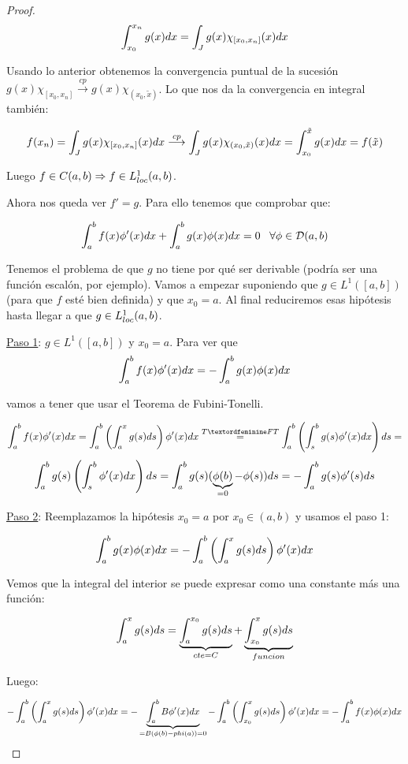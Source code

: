 \begin{proof}
\[
\displaystyle\int_{ x_0 }^{ x_n } g(x)dx=\displaystyle\int_{ J }^{  } g(x)\chi_{[x_0,x_n]}(x)dx
\]

Usando lo anterior obtenemos la convergencia puntual de la sucesión $g(x)\chi_{[x_0,x_n]}\overset{cp}{\longrightarrow}g(x)\chi_{(x_0,\tilde{x})}$. Lo que nos da la convergencia en integral también:

\[
f(x_n)=\displaystyle\int_{ J }^{  } g(x)\chi_{[x_0,x_n]}(x)dx\overset{cp}{\longrightarrow}\displaystyle\int_{ J }^{  } g(x)\chi_{(x_0,\tilde{x})}(x)dx=\displaystyle\int_{ x_0 }^{ \tilde{x} } g(x)dx=f(\tilde{x})
\]

Luego $f\in C(a,b) \Rightarrow f\in L^1_{loc}(a,b)$.

Ahora nos queda ver $f'=g$. Para ello tenemos que comprobar que:

\[
\displaystyle\int_{ a }^{ b } f(x)\phi'(x)dx+\displaystyle\int_{ a }^{ b } g(x)\phi(x)dx=0 \;\;\; \forall \phi\in \mathcal{D}(a,b)
\]

Tenemos el problema de que $g$ no tiene por qué ser derivable (podría ser una función escalón, por ejemplo). Vamos a empezar suponiendo que $g\in L^1([a,b])$ (para que $f$ esté bien definida) y que $x_0=a$. Al final reduciremos esas hipótesis hasta llegar a que $g\in L^1_{loc}(a,b)$.

\underline{Paso 1}: $g\in L^1([a,b])$ y $x_0=a$. Para ver que
\[
\displaystyle\int_{ a }^{ b } f(x)\phi'(x)dx=-\displaystyle\int_{ a }^{ b } g(x)\phi(x)dx 
\]

vamos a tener que usar el Teorema de Fubini-Tonelli.

\[
\integral{a}{b}{f(x)\phi'(x)dx}=
\integral{a}{b}{\left(\integral{a}{x}{g(s)ds}\right)\phi'(x)dx}\overset{TªFT}{=}
\integral{a}{b}{\left(\integral{s}{b}{g(s)\phi'(x)dx}\right)ds}=\]
\[
\displaystyle\int_{ a }^{ b } g(s)\left(\displaystyle\int_{ s }^{ b } \phi'(x)dx\right)ds
=\displaystyle\int_{ a }^{ b } g(s)(\underbrace{\phi(b)}_{=0}-\phi(s))ds=-\displaystyle\int_{ a }^{ b } g(s)\phi'(s)ds
\]

\underline{Paso 2}: Reemplazamos la hipótesis $x_0=a$ por $x_0\in(a,b)$ y usamos el paso 1:

\[
\displaystyle\int_{ a }^{ b } g(x)\phi(x)dx=-\displaystyle\int_{ a }^{ b } \left(\displaystyle\int_{ a }^{ x } g(s)ds\right)\phi'(x)dx
\]

Vemos que la integral del interior se puede expresar como una constante más una función:

\[
\displaystyle\int_{ a }^{ x } g(s)ds=\underbrace{\displaystyle\int_{ a }^{ x_0 } g(s)ds}_{cte=C}+\underbrace{\displaystyle\int_{ x_0 }^{ x } g(s)ds}_{funcion}
\]

Luego:

\[
-\displaystyle\int_{ a }^{ b } \left(\displaystyle\int_{ a }^{ x } g(s)ds\right)\phi'(x)dx=
-\underbrace{\displaystyle\int_{ a }^{ b } B\phi'(x)dx}_{=B(\phi(b)-phi(a))=0}-\displaystyle\int_{ a }^{ b } \left(\displaystyle\int_{ x_0 }^{ x } g(s)ds\right)\phi'(x)dx=
-\displaystyle\int_{ a }^{ b } f(x)\phi(x)dx
\]


\end{proof}
